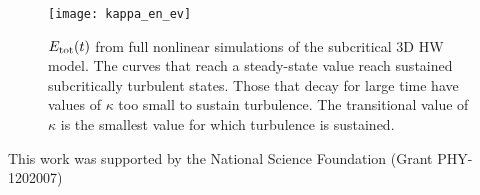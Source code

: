 \documentclass[letter,scriptaddress,twocolumn, prl,showkeys]{revtex4}
\begin{document}
\begin{figure}
\centerline{\texttt{[image: kappa\_en\_ev]}}
\caption{$E_{\rm{tot}}(t)$ from full nonlinear simulations of the subcritical 3D HW model. The curves that reach a steady-state value
reach sustained subcritically turbulent states. Those that decay for large time have values of $\kappa$ too small to sustain turbulence. The transitional value of $\kappa$ is the smallest value
for which turbulence is sustained.}
\label{kappa_en_ev}
\end{figure}


\begin{acknowledgments}
This work was supported by the National Science Foundation (Grant PHY-1202007)
\end{acknowledgments}


%

\end{document}
